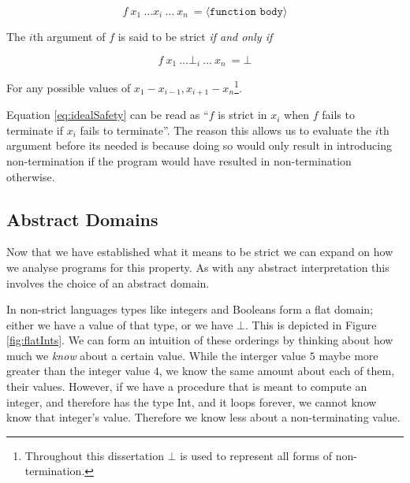 \begin{equation*}
f \ x_{1} \ \dots x_{i} \ \dots \ x_{n} \ = \langle \texttt{function body} \rangle
\end{equation*}

The $i$th argument of $f$ is said to be strict \emph{if and only if}

\begin{equation}
f \ x_{1} \ \dots \bot_{i} \ \dots \ x_{n} \ =  \bot
\end{equation}
\label{eq:idealSafety}

For any possible values of $x_{1}-x_{i-1},x_{i+1}-x_{n}$\footnote{Throughout this
dissertation $\bot$ is used to represent all forms of non-termination.}.

Equation \ref{eq:idealSafety} can be read as ``$f$ is strict in $x_{i}$ when $f$
fails to terminate if $x_{i}$ fails to terminate''. The reason this allows us
to evaluate the $i$th argument before its needed is because doing so would only result
in introducing non-termination if the program would have resulted in non-termination
otherwise.

\subsection{Abstract Domains}

Now that we have established what it means to be strict we can expand on how we
analyse programs for this property. As with any abstract interpretation
 this involves the choice of an abstract domain.

In non-strict languages types like integers and Booleans form a flat domain;
either we have a value of that type, or we have $\bot$. This is depicted in
Figure \ref{fig:flatInts}. We can form an intuition of these orderings by
thinking about how much we \emph{know} about a certain value. While the
interger value $5$ maybe more greater than the integer value $4$, we know the
same amount about each of them, their values. However, if we have a procedure
that is meant to compute an integer, and therefore has the type \<Int\>, and it
loops forever, we cannot know know that integer's value. Therefore we know less
about a non-terminating value.

